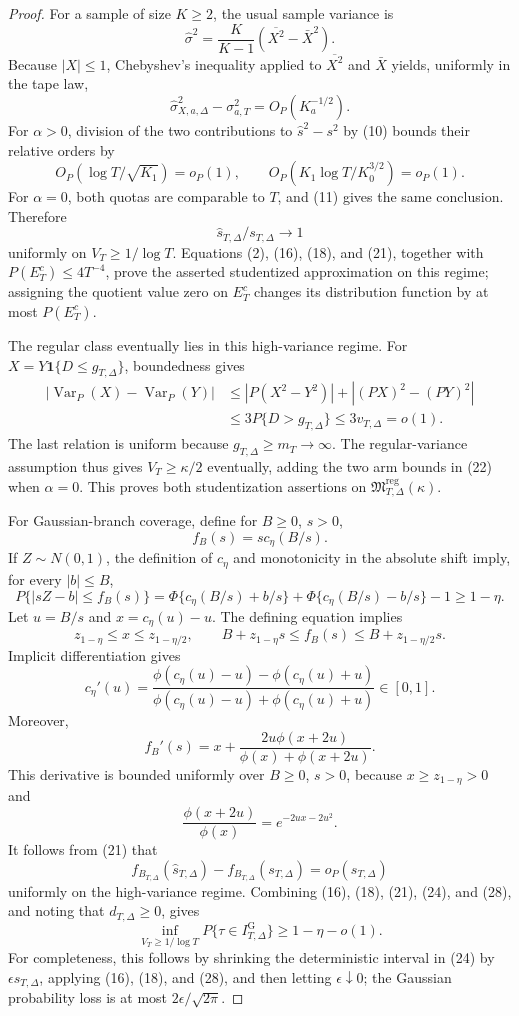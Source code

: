 \documentclass{article}
\begin{document}
\begin{proof}
For a sample of size \(K\geq2\), the usual sample variance is
\[
 \widehat\sigma^2=\frac{K}{K-1}(\overline{X^2}-\bar X^2).
\]
Because \(|X|\leq1\), Chebyshev's inequality applied to \(\overline{X^2}\) and \(\bar X\) yields, uniformly in the tape law,
\[
 \widehat\sigma_{X,a,\Delta}^2-\sigma_{a,T}^2=O_P(K_a^{-1/2}). \tag{19}
\]
For \(\alpha>0\), division of the two contributions to \(\widehat s^2-s^2\) by (10) bounds their relative orders by
\[
 O_P(\log T/\sqrt{K_1})=o_P(1),\qquad
 O_P(K_1\log T/K_0^{3/2})=o_P(1). \tag{20}
\]
For \(\alpha=0\), both quotas are comparable to \(T\), and (11) gives the same conclusion.  Therefore
\[
 \widehat s_{T,\Delta}/s_{T,\Delta}\longrightarrow1 \tag{21}
\]
uniformly on \(V_T\geq1/\log T\).  Equations (2), (16), (18), and (21), together with \(P(E_T^c)\leq4T^{-4}\), prove the asserted studentized approximation on this regime; assigning the quotient value zero on \(E_T^c\) changes its distribution function by at most \(P(E_T^c)\).

The regular class eventually lies in this high-variance regime.  For \(X=Y\mathbf 1\{D\leq g_{T,\Delta}\}\), boundedness gives
\[
 \begin{aligned}
 |\operatorname{Var}_P(X)-\operatorname{Var}_P(Y)|
 &\leq|P(X^2-Y^2)|+|(PX)^2-(PY)^2|\\
 &\leq3P\{D>g_{T,\Delta}\}\leq3v_{T,\Delta}=o(1).
 \end{aligned} \tag{22}
\]
The last relation is uniform because \(g_{T,\Delta}\geq m_T\to\infty\).  The regular-variance assumption thus gives \(V_T\geq\kappa/2\) eventually, adding the two arm bounds in (22) when \(\alpha=0\).  This proves both studentization assertions on \(\mathfrak M_{T,\Delta}^{\mathrm{reg}}(\kappa)\).

For Gaussian-branch coverage, define for \(B\geq0\), \(s>0\),
\[
 f_B(s)=s c_\eta(B/s). \tag{23}
\]
If \(Z\sim N(0,1)\), the definition of \(c_\eta\) and monotonicity in the absolute shift imply, for every \(|b|\leq B\),
\[
 P\{|sZ-b|\leq f_B(s)\}
 =\Phi\{c_\eta(B/s)+b/s\}+\Phi\{c_\eta(B/s)-b/s\}-1
 \geq1-\eta. \tag{24}
\]
Let \(u=B/s\) and \(x=c_\eta(u)-u\).  The defining equation implies
\[
 z_{1-\eta}\leq x\leq z_{1-\eta/2},\qquad
 B+z_{1-\eta}s\leq f_B(s)\leq B+z_{1-\eta/2}s. \tag{25}
\]
Implicit differentiation gives
\[
 c_\eta'(u)=
 \frac{\phi(c_\eta(u)-u)-\phi(c_\eta(u)+u)}
 {\phi(c_\eta(u)-u)+\phi(c_\eta(u)+u)}\in[0,1]. \tag{26}
\]
Moreover,
\[
 f_B'(s)=x+\frac{2u\phi(x+2u)}{\phi(x)+\phi(x+2u)}. \tag{27}
\]
This derivative is bounded uniformly over \(B\geq0\), \(s>0\), because \(x\geq z_{1-\eta}>0\) and
\[
 \frac{\phi(x+2u)}{\phi(x)}=e^{-2ux-2u^2}.
\]
It follows from (21) that
\[
 f_{B_{T,\Delta}}(\widehat s_{T,\Delta})
 -f_{B_{T,\Delta}}(s_{T,\Delta})=o_P(s_{T,\Delta}) \tag{28}
\]
uniformly on the high-variance regime.  Combining (16), (18), (21), (24), and (28), and noting that \(d_{T,\Delta}\geq0\), gives
\[
 \inf_{V_T\geq1/\log T}P\{\tau\in I_{T,\Delta}^{\mathrm G}\}
 \geq1-\eta-o(1). \tag{29}
\]
For completeness, this follows by shrinking the deterministic interval in (24) by \(\epsilon s_{T,\Delta}\), applying (16), (18), and (28), and then letting \(\epsilon\downarrow0\); the Gaussian probability loss is at most \(2\epsilon/\sqrt{2\pi}\).


\end{proof}
\end{document}
